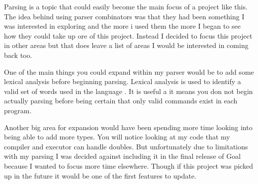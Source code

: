 Parsing is a topic that could easily become the main focus of a project like this. The idea behind using parser combinators was that they had been something I was interested in exploring and the more i used them the more I began to see how they could take up ore of this project. Instead I decided to focus this project in other areas but that does leave a list of areas I would be interested in coming back too. 

One of the main things you could expand within my parser would be to add some lexical analysis before beginning parsing. Lexical analysis is used to identify a valid set of words used in the language \cite[p.~13]{CompDes2005}. It is useful a it means you don not begin actually parsing before being certain that only valid commands exist in each program.

Another big area for expansion would have been spending more time looking into being able to add more types. You will notice looking at my code that my compiler and executor can handle doubles. But unfortunately due to limitations with my parsing I was decided against including it in the final release of Goal because I wanted to focus more time elsewhere. Though if this project was picked up in the future it would be one of the first features to update.    

   
 
